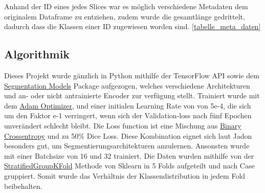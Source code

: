 Anhand der ID eines jedes Slices war es möglich verschiedene Metadaten dem originalem Dataframe zu entziehen, zudem wurde die gesamtlänge gedrittelt, dadurch dass die Klassen einer ID  zugewiesen worden sind. \autoref{tabelle_meta_daten}



\begin{table}[]
 \begin{center}
   \caption{Metadaten für drei slices}\label{tabelle_meta_daten}
 \end{center}
\end{table}

\pagebreak

\subsection{Algorithmik}

Dieses Projekt wurde gänzlich in Python mithilfe der TensorFlow API sowie dem
 \href{https://deepai.org/machine-learning-glossary-and-terms/relu}{Segmentation Models} \citep{Yakubovskiy:2019}
 Package aufgezogen, welches verschiedene Architekturen und an- oder nicht antrainierte Encoder zur verfügung stellt. Trainiert wurde mit dem
\href{https://optimization.cbe.cornell.edu/index.php?title=Adam}{Adam Optimizer},
 und einer initialen Learning Rate von von 5e-4, die sich um den Faktor e-1 verringert, wenn sich der Validation-loss nach fünf Epochen unverändert schlecht bleibt. Die Loss function ist eine Mischung aus 
\href{https://www.analyticsvidhya.com/blog/2021/03/binary-cross-entropy-log-loss-for-binary-classification/}{Binary Crossentropy} und zu 50\%
Dice Loss. Diese Kombination eignet sich laut Jadon  \citep{Jadon_2020} besonders gut, um Segmentierungsarchitekturen anzulernen. Ansonsten wurde mit einer Batchsize von 16 und 32 trainiert.
Die Daten wurden mithilfe von der 
\href{https://scikit-learn.org/stable/modules/generated/sklearn.model_selection.StratifiedGroupKFold.html}{StratifiedGroupKFold} Methode von Sklearn in 5 Folds aufgeteilt und nach Case gruppiert. Somit 
wurde das Verhältnis der Klassendistribution in jedem Fold beibehalten. 

